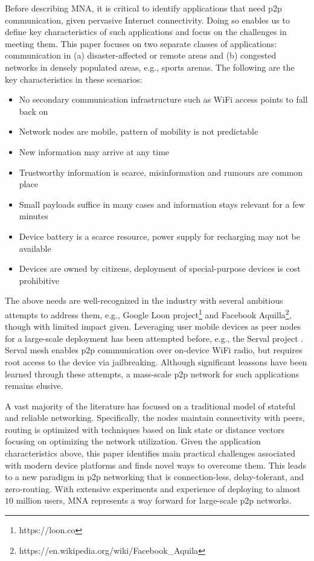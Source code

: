 \documentclass[conference]{IEEEtran}
\begin{document}
Before describing MNA, it is critical to identify applications that
need p2p communication, given pervasive Internet connectivity. Doing
so enables us to define key characteristics of such applications and
focus on the challenges in meeting them.  This paper focuses on two
separate classes of applications: communication in
(a) disaster-affected or remote areas and (b) congested networks in
densely populated areas, e.g., sports arenas.  The following are the
key characteristics in these scenarios:

\begin{itemize}
\item No secondary communication infrastructure such as WiFi
  access points to fall back on
\item Network nodes are mobile, pattern of mobility is not
  predictable
\item New information may arrive at any time
\item Trustworthy information is scarce, misinformation and
  rumours are common place
\item  Small payloads suffice in many cases and information
  stays relevant for a few minutes
\item  Device battery is a scarce resource, power supply
  for recharging may not be available
\item  Devices are owned by citizens, deployment of
  special-purpose devices is cost prohibitive
\end{itemize}

The above needs are well-recognized in the industry with several
ambitious attempts to address them, e.g., Google Loon
project\footnote{https://loon.co} and Facebook
Aquilla\footnote{https://en.wikipedia.org/wiki/Facebook\_Aquila},
though with limited impact given. Leveraging user mobile devices as
peer nodes for a large-scale deployment has been attempted before,
e.g., the Serval project \cite{gardner-stephen-serval-2011}. Serval
mesh enables p2p communication over on-device WiFi radio, but requires
root access to the device via jailbreaking. Although significant
leassons have been learned through these attempts, a mass-scale p2p
network for such applications remains elusive.

A vast majority of the literature has focused on a traditional model
of stateful and reliable networking. Specifically, the nodes maintain
connectivity with peers, routing is optimized with techniques based on
link state or distance vectors
\cite{clausen-olsr-2003,perkins-aodv-2003} focusing on optimizing the
network utilization. Given the application characteristics above, this
paper identifies main practical challenges associated with modern
device platforms and finds novel ways to overcome them.  This leads to
a new paradigm in p2p networking that is connection-less,
delay-tolerant, and zero-routing.  With extensive experiments and
experience of deploying to almost $10$ million users, MNA represents a
way forward for large-scale p2p networks.
\end{document}
